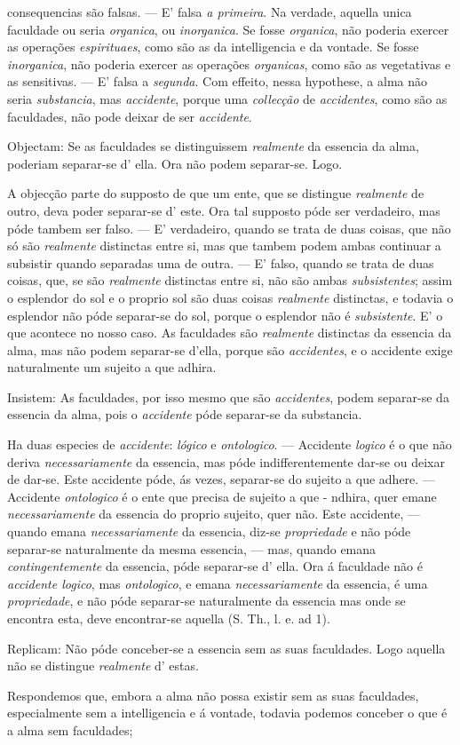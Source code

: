 consequencias são falsas. --- E' falsa \emph{a primeira}. Na verdade, aquella unica faculdade ou seria \emph{organica}, ou \emph{inorganica}. Se fosse \emph{organica}, não poderia exercer as operações \emph{espirituaes}, como são as da intelligencia e da vontade. Se fosse \emph{inorganica}, não poderia exercer as operações \emph{organicas}, como são as vegetativas e as sensitivas. --- E' falsa a \emph{segunda}. Com effeito, nessa hypothese, a alma não seria \emph{substancia}, mas \emph{accidente}, porque uma \emph{collecção} de \emph{accidentes}, como são as faculdades, não pode deixar de ser \emph{accidente}.\par Objectam: Se as faculdades se distinguissem \emph{realmente} da essencia da alma, poderiam separar-se d' ella. Ora não podem separar-se. Logo.\par A objecção parte do supposto de que um ente, que se distingue \emph{realmente} de outro, deva poder separar-se d' este. Ora tal supposto póde ser verdadeiro, mas póde tambem ser falso. --- E' verdadeiro, quando se trata de duas coisas, que não só são \emph{realmente} distinctas entre si, mas que tambem podem ambas continuar a subsistir quando separadas uma de outra. --- E' falso, quando se trata de duas coisas, que, se são \emph{realmente} distinctas entre si, não são ambas \emph{subsistentes}; assim o esplendor do sol e o proprio sol são duas coisas \emph{realmente} distinctas, e todavia o esplendor não póde separar-se do sol, porque o esplendor não é \emph{subsistente}. E' o que acontece no nosso caso. As faculdades são \emph{realmente} distinctas da essencia da alma, mas não podem separar-se d'ella, porque são \emph{accidentes}, e o accidente exige naturalmente um sujeito a que adhira.\par Insistem: As faculdades, por isso mesmo que são \emph{accidentes}, podem separar-se da essencia da alma, pois o \emph{accidente} póde separar-se da substancia.\par Ha duas especies de \emph{accidente}: \emph{lógico} e \emph{ontologico}. --- Accidente \emph{logico} é o que não deriva \emph{necessariamente} da essencia, mas póde indifferentemente dar-se ou deixar de dar-se. Este accidente póde, ás vezes, separar-se do sujeito a que adhere. --- Accidente \emph{ontologico} é o ente que precisa de sujeito a que - ndhira, quer emane \emph{necessariamente} da essencia do proprio sujeito, quer não. Este accidente, --- quando emana \emph{necessariamente} da essencia, diz-se \emph{propriedade} e não póde separar-se naturalmente da mesma essencia, --- mas, quando emana \emph{contingentemente} da essencia, póde separar-se d' ella. Ora á faculdade não é \emph{accidente logico}, mas \emph{ontologico}, e emana \emph{necessariamente} da essencia, é uma \emph{propriedade}, e não póde separar-se naturalmente da essencia mas onde se encontra esta, deve encontrar-se aquella (S. Th., l. e. ad 1).\par Replicam: Não póde conceber-se a essencia sem as suas faculdades. Logo aquella não se distingue \emph{realmente} d' estas.\par Respondemos que, embora a alma não possa existir sem as suas faculdades, especialmente sem a intelligencia e á vontade, todavia podemos conceber o que é a alma sem faculdades; 